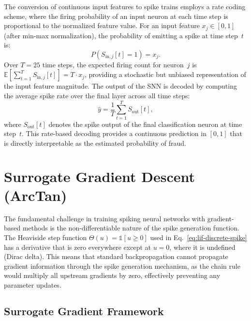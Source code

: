The conversion of continuous input features to spike trains employs a rate coding scheme, where the firing probability of an input neuron at each time step is proportional to the normalized feature value. For an input feature $x_j \in [0, 1]$ (after min-max normalization), the probability of emitting a spike at time step~$t$ is:
\begin{equation}
P(S_{\text{in},j}[t] = 1) = x_j.
\label{eq:rate-coding}
\end{equation}
Over $T = 25$ time steps, the expected firing count for neuron~$j$ is $\mathbb{E}[\sum_{t=1}^{T} S_{\text{in},j}[t]] = T \cdot x_j$, providing a stochastic but unbiased representation of the input feature magnitude. The output of the SNN is decoded by computing the average spike rate over the final layer across all time steps:
\begin{equation}
\hat{y} = \frac{1}{T} \sum_{t=1}^{T} S_{\text{out}}[t],
\label{eq:rate-decoding}
\end{equation}
where $S_{\text{out}}[t]$ denotes the spike output of the final classification neuron at time step~$t$. This rate-based decoding provides a continuous prediction in $[0, 1]$ that is directly interpretable as the estimated probability of fraud.

\section{Surrogate Gradient Descent (ArcTan)}
\label{app:surrogate-gradient}

The fundamental challenge in training spiking neural networks with gradient-based methods is the non-differentiable nature of the spike generation function. The Heaviside step function $\Theta(u) = \mathbb{1}[u \geq 0]$ used in Eq.~\eqref{eq:lif-discrete-spike} has a derivative that is zero everywhere except at $u = 0$, where it is undefined (Dirac delta). This means that standard backpropagation cannot propagate gradient information through the spike generation mechanism, as the chain rule would multiply all upstream gradients by zero, effectively preventing any parameter updates.

\subsection{Surrogate Gradient Framework}

